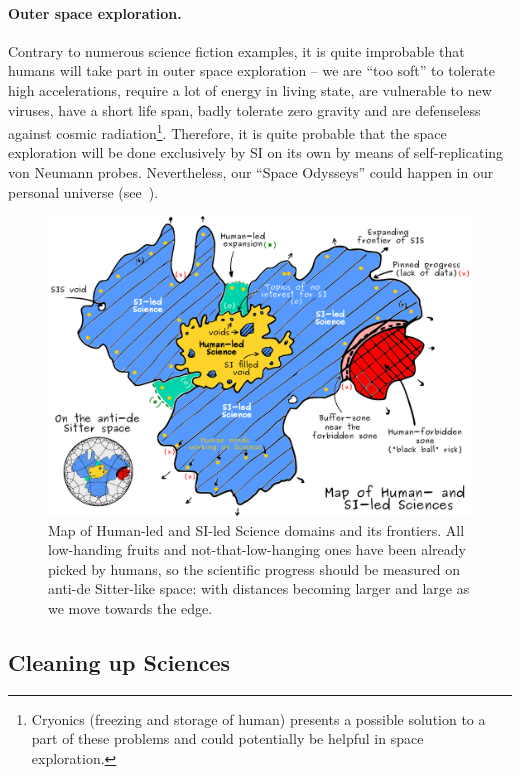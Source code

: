 \documentclass[a4paper,11pt]{article}
\begin{document}
\paragraph{Outer space exploration.}
Contrary to numerous science fiction examples, it is quite improbable that humans will take part in outer space exploration -- we are ``too soft'' to tolerate high accelerations, require a lot of energy in living state, are vulnerable to new viruses, have a short life span, badly tolerate zero gravity and are defenseless against cosmic radiation\footnote{Cryonics (freezing and storage of human) presents a possible solution to a part of these problems and could potentially be helpful in space exploration.}. Therefore, it is quite probable that the space exploration will be done exclusively by SI on its own by means of self-replicating von Neumann probes. Nevertheless, our ``Space Odysseys'' could happen in our personal universe (see~).

\begin{figure}[htb!]
    \centering\includegraphics[width=1\textwidth]{map}
    \caption{\label{fig:map}Map of Human-led and SI-led Science domains and its frontiers. All low-handing fruits and not-that-low-hanging ones have been already picked by humans, so the scientific progress should be measured on anti-de Sitter-like space: with distances becoming larger and large as we move towards the edge.}
\end{figure}

\subsection{Cleaning up Sciences}
\end{document}
